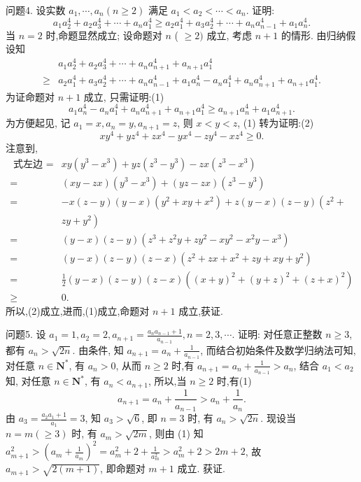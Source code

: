 问题4. 设实数 $a_1, \cdots, a_n(n \geqslant 2)$ 满足 $a_1<a_2<\cdots<a_n$. 证明:
$$
a_1 a_2^4+a_2 a_3^4+\cdots+a_n a_1^4 \geqslant a_2 a_1^4+a_3 a_2^4+\cdots+a_n a_{n-1}^4+a_1 a_n^4 .
$$
当 $n=2$ 时,命题显然成立; 设命题对 $n$ ( $\geqslant 2)$ 成立, 考虑 $n+1$ 的情形.
由归纳假设知
$$
\begin{aligned}
& a_1 a_2^4+a_2 a_3^4+\cdots+a_n a_{n+1}^4+a_{n+1} a_1^4 \\
\geqslant & a_2 a_1^4+a_3 a_2^4+\cdots+a_n a_{n-1}^4+a_1 a_n^4-a_n a_1^4+a_n a_{n+1}^4+a_{n+1} a_1^4 .
\end{aligned}
$$
为证命题对 $n+1$ 成立, 只需证明:(1)
$$
a_1 a_n^4-a_n a_1^4+a_n a_{n+1}^4+a_{n+1} a_1^4 \geqslant a_{n+1} a_n^4+a_1 a_{n+1}^4 .
$$
为方便起见, 记 $a_1=x, a_n=y, a_{n+1}=z$, 则 $x<y<z$, (1) 转为证明:(2)
$$
x y^4+y z^4+z x^4-y x^4-z y^4-x z^4 \geqslant 0 .
$$
注意到,
$$
\begin{aligned}
\text { 式左边 }= & x y\left(y^3-x^3\right)+y z\left(z^3-y^3\right)-z x\left(z^3-x^3\right) \\
= & (x y-z x)\left(y^3-x^3\right)+(y z-z x)\left(z^3-y^3\right) \\
= & -x(z-y)(y-x)\left(y^2+x y+x^2\right)+z(y-x)(z-y)\left(z^2+\right. \\
& \left.z y+y^2\right) \\
= & (y-x)(z-y)\left(z^3+z^2 y+z y^2-x y^2-x^2 y-x^3\right) \\
= & (y-x)(z-y)(z-x)\left(z^2+z x+x^2+z y+x y+y^2\right) \\
= & \frac{1}{2}(y-x)(z-y)(z-x)\left((x+y)^2+(y+z)^2+(z+x)^2\right) \\
\geqslant & 0 .
\end{aligned}
$$
所以,(2)成立,进而,(1)成立,命题对 $n+1$ 成立,获证.



问题5. 设 $a_1=1, a_2=2, a_{n+1}=\frac{a_n a_{n-1}+1}{a_{n-1}}, n=2,3, \cdots$.
证明: 对任意正整数 $n \geqslant 3$, 都有 $a_n>\sqrt{2 n}$.
由条件, 知 $a_{n+1}=a_n+\frac{1}{a_{n-1}}$, 而结合初始条件及数学归纳法可知, 对任意 $n \in \mathbf{N}^*$, 有 $a_n>0$, 从而 $n \geqslant 2$ 时,有 $a_{n+1}=a_n+\frac{1}{a_{n-1}}>a_n$, 结合 $a_1<a_2$ 知, 对任意 $n \in \mathbf{N}^*$, 有 $a_n<a_{n+1}$, 所以,当 $n \geqslant 2$ 时,有(1)
$$
a_{n+1}=a_n+\frac{1}{a_{n-1}}>a_n+\frac{1}{a_n} .
$$
由 $a_3=\frac{a_2 a_1+1}{a_1}=3$, 知 $a_3>\sqrt{6}$, 即 $n=3$ 时, 有 $a_n>\sqrt{2 n}$. 现设当 $n= m(\geqslant 3)$ 时, 有 $a_m>\sqrt{2 m}$, 则由 (1) 知 $a_{m+1}^2>\left(a_m+\frac{1}{a_m}\right)^2=a_m^2+2+\frac{1}{a_m^2}> a_m^2+2>2 m+2$, 故 $a_{m+1}>\sqrt{2(m+1)}$, 即命题对 $m+1$ 成立.
获证.



